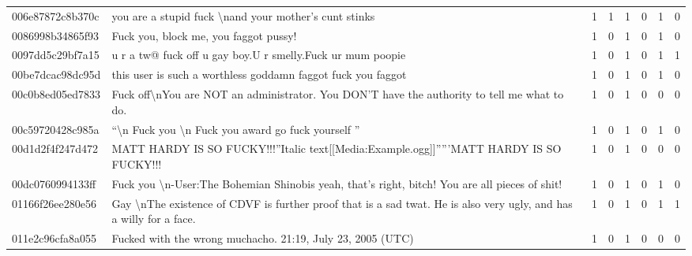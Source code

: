 \begin{sidewaystable}[htb!]
\begin{tabularx}{\textwidth}{L{0.8} L{6.6} C{0.1} C{0.1} C{0.1} C{0.1} C{0.1} C{0.1}}
        006e87872c8b370c & you are a stupid fuck \textbackslash nand your mother's cunt stinks                                                              & 1           & 1           & 1           & 0           & 1           & 0           \\
        0086998b34865f93 & Fuck you, block me, you faggot pussy!                                                                                            & 1           & 0           & 1           & 0           & 1           & 0           \\
        0097dd5c29bf7a15 & u r a tw@ fuck off u gay boy.U r smelly.Fuck ur mum poopie                                                                       & 1           & 0           & 1           & 0           & 1           & 1           \\
        00be7dcac98dc95d & this user is such a worthless goddamn faggot fuck you faggot                                                                     & 1           & 0           & 1           & 0           & 1           & 0           \\
        00c0b8ed05ed7833 & Fuck off\textbackslash nYou are NOT an administrator. You DON'T have the authority to tell me what to do.                        & 1           & 0           & 1           & 0           & 0           & 0           \\
        00c59720428c985a & ``\textbackslash n Fuck you \textbackslash n Fuck you award go fuck yourself ''                                                  & 1           & 0           & 1           & 0           & 1           & 0           \\
        00d1d2f4f247d472 & MATT HARDY IS SO FUCKY!!!''Italic text[[Media:Example.ogg]]'''''MATT HARDY IS SO FUCKY!!!                                        & 1           & 0           & 1           & 0           & 0           & 0           \\
        00dc0760994133ff & Fuck you \textbackslash n-User:The Bohemian Shinobis yeah, that's right, bitch! You are all pieces of shit!                      & 1           & 0           & 1           & 0           & 1           & 0           \\
        01166f26ee280e56 & Gay \textbackslash nThe existence of CDVF is further proof that is a sad twat. He is also very ugly, and has a willy for a face. & 1           & 0           & 1           & 0           & 1           & 1           \\
        011e2c96cfa8a055 & Fucked with the wrong muchacho. 21:19, July 23, 2005 (UTC)                                                                       & 1           & 0           & 1           & 0           & 0           & 0           \\

\end{tabularx}
\end{sidewaystable}
